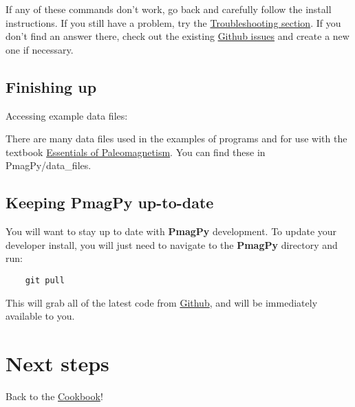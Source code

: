 \documentclass[11pt]{article}
\begin{document}
If any of these commands don't work, go back and carefully follow the install instructions.  If you still have a problem, try the \href{https://earthref.org/PmagPy/cookbook/#trouble}{Troubleshooting section}.  If you don't find an answer there, check out the existing \href{https://github.com/PmagPy/PmagPy/issues}{Github issues} and create a new one if necessary.

\subsection{Finishing up}

Accessing example data files:

   There are many data files used in the examples of programs and for use with the textbook  \href{http://earthref.org/MAGIC/books/Tauxe/Essentials/WebBook3.html}{Essentials of Paleomagnetism}.  You can find these in PmagPy/data_files.

\subsection{Keeping PmagPy up-to-date}

    You will want to stay up to date with {\bf PmagPy} development.  To update your developer install, you will just need to navigate to the {\bf PmagPy} directory and run:

\begin{verbatim}
    git pull
\end{verbatim}

This will grab all of the latest code from \href{https://github.com/PmagPy/PmagPy}{Github}, and will be immediately available to you.


\section{Next steps}

Back to the \href{https://earthref.org/PmagPy/cookbook/#next_steps}{Cookbook}!
\end{document}
